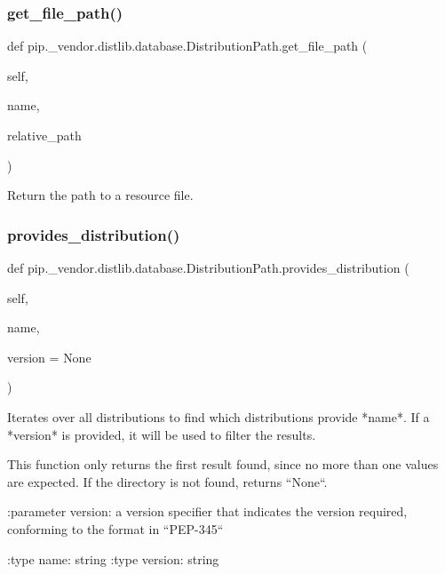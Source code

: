 \subsubsection{\texorpdfstring{get\+\_\+file\+\_\+path()}{get\_file\_path()}}
{\footnotesize\ttfamily def pip.\+\_\+vendor.\+distlib.\+database.\+Distribution\+Path.\+get\+\_\+file\+\_\+path (\begin{DoxyParamCaption}\item[{}]{self,  }\item[{}]{name,  }\item[{}]{relative\+\_\+path }\end{DoxyParamCaption})}

\begin{DoxyVerb}Return the path to a resource file.
\end{DoxyVerb}
 \mbox{\label{classpip_1_1__vendor_1_1distlib_1_1database_1_1DistributionPath_a149d6da691331a1302cad987fd42d23e}} 
\subsubsection{\texorpdfstring{provides\+\_\+distribution()}{provides\_distribution()}}
{\footnotesize\ttfamily def pip.\+\_\+vendor.\+distlib.\+database.\+Distribution\+Path.\+provides\+\_\+distribution (\begin{DoxyParamCaption}\item[{}]{self,  }\item[{}]{name,  }\item[{}]{version = {\ttfamily None} }\end{DoxyParamCaption})}

\begin{DoxyVerb}Iterates over all distributions to find which distributions provide *name*.
If a *version* is provided, it will be used to filter the results.

This function only returns the first result found, since no more than
one values are expected. If the directory is not found, returns ``None``.

:parameter version: a version specifier that indicates the version
            required, conforming to the format in ``PEP-345``

:type name: string
:type version: string
\end{DoxyVerb}
 

